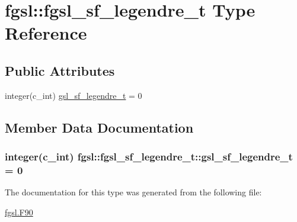 \hypertarget{structfgsl_1_1fgsl__sf__legendre__t}{}\section{fgsl\+:\+:fgsl\+\_\+sf\+\_\+legendre\+\_\+t Type Reference}
\label{structfgsl_1_1fgsl__sf__legendre__t}
\subsection*{Public Attributes}
\begin{DoxyCompactItemize}
\item 
integer(c\+\_\+int) \hyperlink{structfgsl_1_1fgsl__sf__legendre__t_a1c34436bf7a2807eb335c8558951bd3b}{gsl\+\_\+sf\+\_\+legendre\+\_\+t} = 0
\end{DoxyCompactItemize}


\subsection{Member Data Documentation}
\hypertarget{structfgsl_1_1fgsl__sf__legendre__t_a1c34436bf7a2807eb335c8558951bd3b}{}
\subsubsection[{gsl\+\_\+sf\+\_\+legendre\+\_\+t}]{\setlength{\rightskip}{0pt plus 5cm}integer(c\+\_\+int) fgsl\+::fgsl\+\_\+sf\+\_\+legendre\+\_\+t\+::gsl\+\_\+sf\+\_\+legendre\+\_\+t = 0}\label{structfgsl_1_1fgsl__sf__legendre__t_a1c34436bf7a2807eb335c8558951bd3b}


The documentation for this type was generated from the following file\+:\begin{DoxyCompactItemize}
\item 
\hyperlink{fgsl_8F90}{fgsl.\+F90}\end{DoxyCompactItemize}

